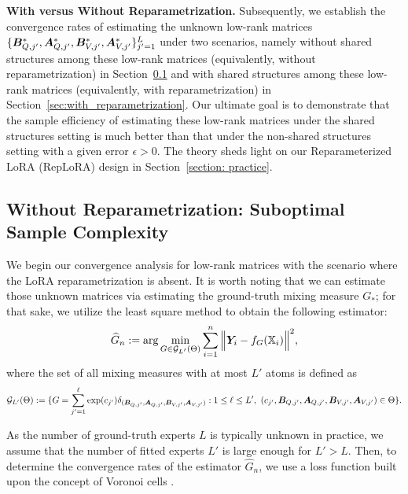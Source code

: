 \vspace{0.5 em}
\noindent
\textbf{With versus Without Reparametrization.} Subsequently, we establish the convergence rates of estimating the unknown low-rank matrices $\{{\bm B}_{Q,j'}^*,{\bm A}_{Q,j'}^*,{\bm B}_{V,j'}^*,{\bm A}_{V,j'}^*\}_{j' = 1}^{L}$ under two scenarios, namely without shared structures among these low-rank matrices (equivalently, without reparametrization) in Section~\ref{sec:without_reparametrization} and with shared structures among these low-rank matrices (equivalently, with reparametrization) in Section~\ref{sec:with_reparametrization}. Our ultimate goal is to demonstrate that the sample efficiency of estimating these low-rank matrices under the shared structures setting is much better than that under the non-shared structures setting with a given error $\epsilon>0$. The theory sheds light on our Reparameterized LoRA (RepLoRA) design in Section~\ref{section: practice}. 


\subsection{Without Reparametrization: Suboptimal Sample Complexity}
\label{sec:without_reparametrization}
We begin our convergence analysis for low-rank matrices with the scenario where the LoRA reparametrization is absent. It is worth noting that we can estimate those unknown matrices via estimating the ground-truth mixing measure $G_*$; for that sake, we utilize the least square method \cite{vandeGeer-00} to obtain the following estimator:
\begin{align}
    \label{eq:least_squared_estimator}
    \widehat{G}_n:=\textnormal{arg} \min_{G\in\mathcal{G}_{L'}(\Theta)}\sum_{i=1}^{n}\Big\|{\bm Y}_i-f_{G}(\mathbb{X}_i)\Big\|^2,
\end{align}
where the set of all mixing measures with at most $L'$ atoms is defined as 
$$\mathcal{G}_{L'}(\Theta):=\{G = \sum_{j' = 1}^{\ell} \exp(c_{j'}) \delta_{({\bm B}_{Q,j'},{\bm A}_{Q,j'},{\bm B}_{V,j'},{\bm A}_{V,j'})}:1\leq \ell\leq L', \  (c_{j'},{\bm B}_{Q,j'},{\bm A}_{Q,j'},{\bm B}_{V,j'},{\bm A}_{V,j'})\in\Theta\}.$$ 

As the number of ground-truth experts $L$ is typically unknown in practice, we assume that the number of fitted experts $L'$ is large enough for $L'>L$. 
Then, to determine the convergence rates of the estimator $\widehat{G}_n$, we use a loss function built upon the concept of Voronoi cells \cite{manole22refined}.

